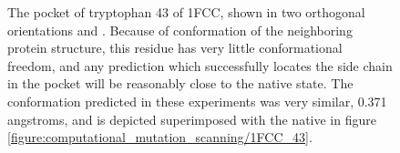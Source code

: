 \begin{figure}[h]
\begin{subfigure}[b]{0.3\textwidth}
        \caption{}
        \label{figure:mutation_side_chain_images/in_pocket_in_plane.png}
    \end{subfigure}
    \caption{The pocket of tryptophan 43 of 1FCC, shown in two orthogonal orientations \label{figure:mutation_side_chain_images/in_pocket_out_of_plane} and \label{figure:mutation_side_chain_images/in_pocket_in_plane.png}.
Because of conformation of the neighboring protein structure, this residue has very little conformational freedom, and any prediction which successfully locates the side chain in the pocket will be reasonably close to the native state.
The conformation predicted in these experiments was very similar, 0.371 angstroms, and is depicted superimposed with the native in figure \protect\ref{figure:computational_mutation_scanning/1FCC_43}.}
    \label{figure:1fcc_43_pocket}
\end{figure}


